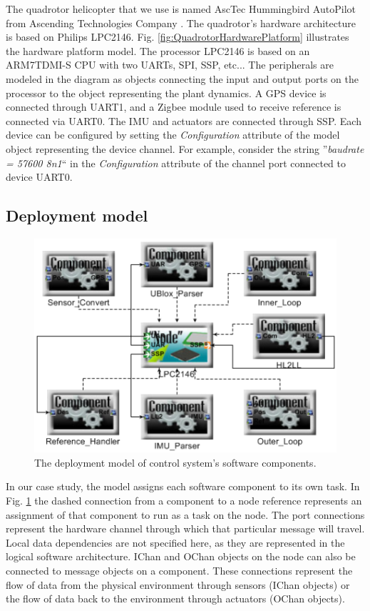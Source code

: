 \documentclass[10pt, conference, compsocconf]{IEEEtran}
\begin{document}
The quadrotor helicopter that we use is named AscTec Hummingbird AutoPilot from Ascending Technologies Company \cite{asctech:hummingbird}. The quadrotor's hardware architecture is based on Philips LPC2146. Fig. \ref{fig:QuadrotorHardwarePlatform} illustrates the hardware platform model. The processor LPC2146 is based on an ARM7TDMI-S CPU with two UARTs, SPI, SSP, etc... The peripherals are modeled in the diagram as objects connecting the input and output ports on the processor to the object representing the plant dynamics. A GPS device is connected through UART1, and a Zigbee module used to receive reference is connected via UART0. The IMU and actuators are connected through SSP. Each device can be configured by setting the \emph{Configuration} attribute of the model object representing the device channel. For example, consider the string ''\emph{baudrate = 57600 8n1}`` in the \emph{Configuration} attribute of the channel port connected to device UART0.

\subsection{Deployment model}

\begin{figure}[!t]
\centering
\includegraphics[width=\columnwidth]{figures/QuadrotorDeployment.png}
\caption{The deployment model of control system's software components.}
\label{fig:QuadrotorDeployment}
\end{figure}

In our case study, the model assigns each software component to its own task. In Fig. \ref{fig:QuadrotorDeployment} the dashed connection from a component to a node reference represents an assignment of that component to run as a task on the node. The port connections represent the hardware channel through which that particular message will travel. Local data dependencies are not specified here, as they are represented in the logical software architecture. IChan and OChan objects on the node can also be connected to message objects on a component. These connections represent the flow of data from the physical environment through sensors (IChan objects) or the flow of data back to the environment through actuators (OChan objects).
\end{document}
